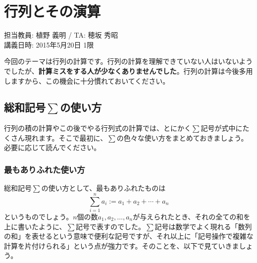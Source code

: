 \chapter{行列とその演算}

\begin{flushright}
担当教員: 植野 義明 / TA: 穂坂 秀昭 \\
講義日時: 2015年5月20日 1限
\end{flushright}

今回のテーマは行列の計算です。行列の計算を理解できていない人はいないようでしたが、\textbf{計算ミスをする人が少なくありませんでした}。行列の計算は今後多用しますから、この機会に十分慣れておいてください。

\section[総和記号Σの使い方]{総和記号$\sum$の使い方}

行列の積の計算やこの後でやる行列式の計算では、とにかく$\sum$記号が式中にたくさん現れます。そこで最初に、$\sum$の色々な使い方をまとめておきましょう。必要に応じて読んでください。

\subsection{最もありふれた使い方}

総和記号$\sum$の使い方として、最もありふれたものは
\[
\sum_{i = 1}^n a_i := a_1 + a_2  + \cdots + a_n
\]
というものでしょう。$n$個の数$a_1,a_2,\ldots,a_n$が与えられたとき、それの全ての和を上に書いたように、$\sum$記号で表すのでした。$\sum$記号は数学でよく現れる「数列の和」を表せるという意味で便利な記号ですが、それ以上に「記号操作で複雑な計算を片付けられる」という点が強力です。そのことを、以下で見ていきましょう。

